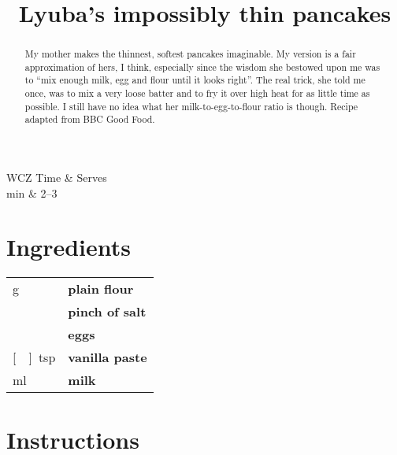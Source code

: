 \documentclass[main.tex]{subfiles}
\title{Lyuba's impossibly thin pancakes}
\begin{document}
\maketitle

\begin{margintable}
\begin{tabularx}{\textwidth}{WCZ}
Time  & Serves\\ 
 min & 2--3
\end{tabularx}
\end{margintable}

\begin{abstract}
My mother makes the thinnest, softest pancakes imaginable. My version is a fair approximation of hers, I think, especially since the wisdom she bestowed upon me was to ``mix enough milk, egg and flour until it looks right''. The real trick, she told me once, was to mix a very loose batter and to fry it over high heat for as little time as possible. I still have no idea what her milk-to-egg-to-flour ratio is though.
\linebreak
Recipe adapted from BBC Good Food.
\end{abstract}

\section{Ingredients}

\vspace*{-\baselineskip}
\begin{table}[ht]
	\begin{tabularx}{\textwidth}{>{\hsize=0.333\hsize}X>{\bf\hsize=1\hsize}X}
	\unit[100]{g} & plain flour\\
	\unit[]{} & pinch of salt\\
	\unit[2]{} & eggs\\
	\unit[\nicefrac{1}{2}]{tsp} & vanilla paste\\
	\unit[350]{ml} & milk\\
	\end{tabularx}
\end{table}

\section{Instructions}
\end{document}
